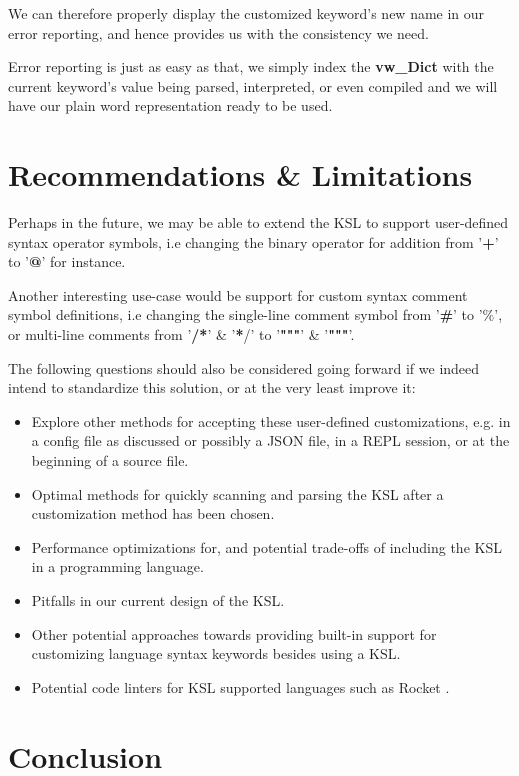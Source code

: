 \documentclass{article}
\begin{document}
We can therefore properly display the customized keyword's new name in our error reporting, and hence provides us with the consistency we need.

Error reporting is just as easy as that, we simply index the \textbf{vw\_Dict} with the current keyword's value being parsed, interpreted, or even compiled and we will have our plain word representation ready to be used.

\section*{Recommendations \& Limitations}

Perhaps in the future, we may be able to extend the KSL to support user-defined syntax operator symbols, i.e changing the binary operator for addition from '\textbf{+}' to '\textbf{@}' for instance.
  
Another interesting use-case would be support for custom syntax comment symbol definitions, i.e changing the single-line comment symbol from '\textbf{\#}' to '\textbf{$\%$}', or multi-line comments from '\textbf{/*}' \& '\textbf{*}/' to '\textbf{"""}' \& '\textbf{"""}'.
  
The following questions should also be considered going forward if we indeed intend to standardize this solution, or at the very least improve it:
  
\begin{itemize}
    \item Explore other methods for accepting these user-defined customizations, e.g. in a config file as discussed or possibly a JSON file, in a REPL session, or at the beginning of a source file.
    \item Optimal methods for quickly scanning and parsing the KSL after a customization method has been chosen.
    \item Performance optimizations for, and potential trade-offs of including the KSL in a programming language.
    \item Pitfalls in our current design of the KSL.
    \item Other potential approaches towards providing built-in support for customizing language syntax keywords besides using a KSL.
    \item Potential code linters for KSL supported languages such as Rocket \cite{Rocket}.
\end{itemize}
  
\section*{Conclusion}
  
\end{document}
